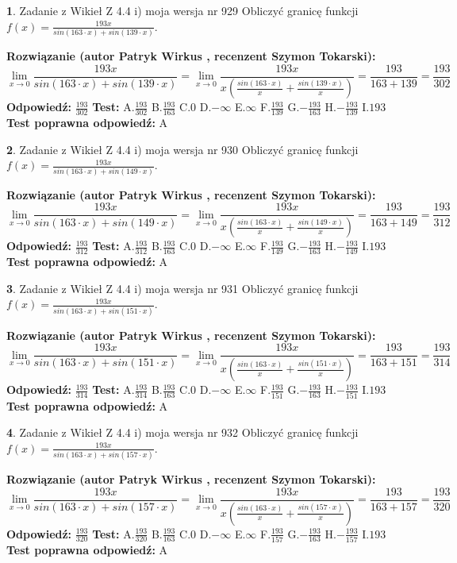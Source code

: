 \documentclass[12pt, a4paper]{article}
\theoremstyle{definition} %
\newtheorem{zad}{}
\newcommand{\zadStart}[1]{\begin{zad}#1\newline}
\newcommand{\zadStop}{\end{zad}}
\newcommand{\rozwStart}[2]{\noindent \textbf{Rozwiązanie (autor #1 , recenzent #2): }\newline}
\newcommand{\rozwStop}{\newline}
\newcommand{\odpStart}{\noindent \textbf{Odpowiedź:}\newline}
\newcommand{\odpStop}{\newline}
\newcommand{\testStart}{\noindent \textbf{Test:}\newline}
\newcommand{\testStop}{\newline}
\newcommand{\kluczStart}{\noindent \textbf{Test poprawna odpowiedź:}\newline}
\newcommand{\kluczStop}{\newline}
\begin{document}
\zadStart{Zadanie z Wikieł Z 4.4 i) moja wersja nr 929}
Obliczyć granicę funkcji $f(x)=\frac{193x}{sin(163\cdot x) +sin(139\cdot x)}$.
\zadStop
\rozwStart{Patryk Wirkus}{Szymon Tokarski}
$$\lim\limits_{x\to 0}\frac{193x}{sin(163\cdot x) +sin(139\cdot x)}=\lim\limits_{x\to 0}\frac{193x}{x(\frac{sin(163\cdot x)}{x}+\frac{sin(139\cdot x)}{x})}=\frac{193}{163+139} = \frac{193}{302}$$
\rozwStop
\odpStart
$\frac{193}{302}$
\odpStop
\testStart
A.$\frac{193}{302}$
B.$\frac{193}{163}$
C.$0$
D.$-\infty$
E.$\infty$
F.$\frac{193}{139}$
G.$-\frac{193}{163}$
H.$-\frac{193}{139}$
I.$193$
\testStop
\kluczStart
A
\kluczStop



\zadStart{Zadanie z Wikieł Z 4.4 i) moja wersja nr 930}
Obliczyć granicę funkcji $f(x)=\frac{193x}{sin(163\cdot x) +sin(149\cdot x)}$.
\zadStop
\rozwStart{Patryk Wirkus}{Szymon Tokarski}
$$\lim\limits_{x\to 0}\frac{193x}{sin(163\cdot x) +sin(149\cdot x)}=\lim\limits_{x\to 0}\frac{193x}{x(\frac{sin(163\cdot x)}{x}+\frac{sin(149\cdot x)}{x})}=\frac{193}{163+149} = \frac{193}{312}$$
\rozwStop
\odpStart
$\frac{193}{312}$
\odpStop
\testStart
A.$\frac{193}{312}$
B.$\frac{193}{163}$
C.$0$
D.$-\infty$
E.$\infty$
F.$\frac{193}{149}$
G.$-\frac{193}{163}$
H.$-\frac{193}{149}$
I.$193$
\testStop
\kluczStart
A
\kluczStop



\zadStart{Zadanie z Wikieł Z 4.4 i) moja wersja nr 931}
Obliczyć granicę funkcji $f(x)=\frac{193x}{sin(163\cdot x) +sin(151\cdot x)}$.
\zadStop
\rozwStart{Patryk Wirkus}{Szymon Tokarski}
$$\lim\limits_{x\to 0}\frac{193x}{sin(163\cdot x) +sin(151\cdot x)}=\lim\limits_{x\to 0}\frac{193x}{x(\frac{sin(163\cdot x)}{x}+\frac{sin(151\cdot x)}{x})}=\frac{193}{163+151} = \frac{193}{314}$$
\rozwStop
\odpStart
$\frac{193}{314}$
\odpStop
\testStart
A.$\frac{193}{314}$
B.$\frac{193}{163}$
C.$0$
D.$-\infty$
E.$\infty$
F.$\frac{193}{151}$
G.$-\frac{193}{163}$
H.$-\frac{193}{151}$
I.$193$
\testStop
\kluczStart
A
\kluczStop



\zadStart{Zadanie z Wikieł Z 4.4 i) moja wersja nr 932}
Obliczyć granicę funkcji $f(x)=\frac{193x}{sin(163\cdot x) +sin(157\cdot x)}$.
\zadStop
\rozwStart{Patryk Wirkus}{Szymon Tokarski}
$$\lim\limits_{x\to 0}\frac{193x}{sin(163\cdot x) +sin(157\cdot x)}=\lim\limits_{x\to 0}\frac{193x}{x(\frac{sin(163\cdot x)}{x}+\frac{sin(157\cdot x)}{x})}=\frac{193}{163+157} = \frac{193}{320}$$
\rozwStop
\odpStart
$\frac{193}{320}$
\odpStop
\testStart
A.$\frac{193}{320}$
B.$\frac{193}{163}$
C.$0$
D.$-\infty$
E.$\infty$
F.$\frac{193}{157}$
G.$-\frac{193}{163}$
H.$-\frac{193}{157}$
I.$193$
\testStop
\kluczStart
A
\kluczStop
\end{document}
